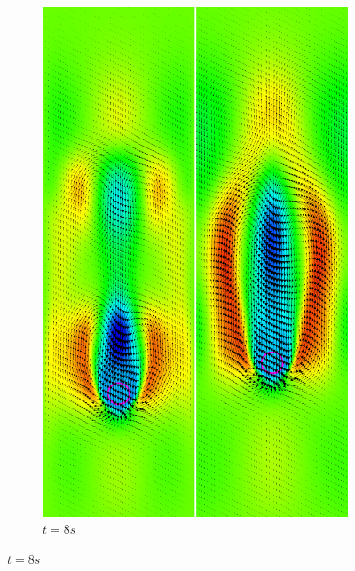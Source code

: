 \begin{figure}[H]
\begin{subfigure}[ht!]{0.3\textwidth}
		\includegraphics[width=1\textwidth]{compare_CL/t=8s.png}
		\caption{$t=8s$}
	\end{subfigure}
\end{figure} \vspace{-0.8cm}

